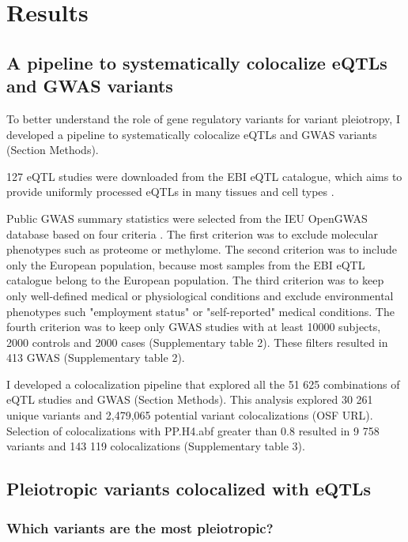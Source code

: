 \section*{Results}\label{s:results}

\subsection*{A pipeline to systematically colocalize eQTLs and GWAS variants}

To better understand the role of gene regulatory variants for variant pleiotropy, I developed a pipeline to systematically colocalize eQTLs and GWAS variants (Section Methods).

127 eQTL studies were downloaded from the EBI eQTL catalogue, which aims to provide uniformly processed eQTLs in many tissues and cell types \citep{2021.Alasoo.Kerimov}.

Public GWAS summary statistics were selected from the IEU OpenGWAS database based on four criteria \citep{2018.Parkinson.Buniello}.
%
The first criterion was to exclude molecular phenotypes such as proteome or methylome.
%	
The second criterion was to include only the European population, because most samples from the EBI eQTL catalogue belong to the European population.
%
The third criterion was to keep only well-defined medical or physiological conditions and exclude environmental phenotypes such "employment status" or "self-reported" medical conditions.
%
The fourth criterion was to keep only GWAS studies with at least 10000 subjects, 2000 controls and 2000 cases (Supplementary table 2).
%
These filters resulted in 413 GWAS (Supplementary table 2).

I developed a colocalization pipeline that explored all the 51 625 combinations of eQTL studies and GWAS (Section Methods).
%
This analysis explored 30 261 unique variants and 2,479,065 potential variant colocalizations (OSF URL).
%
Selection of colocalizations with PP.H4.abf greater than 0.8 resulted in 9 758 variants and 143 119 colocalizations (Supplementary table 3).

\subsection*{Pleiotropic variants colocalized with eQTLs}

\subsubsection*{Which variants are the most pleiotropic?}

